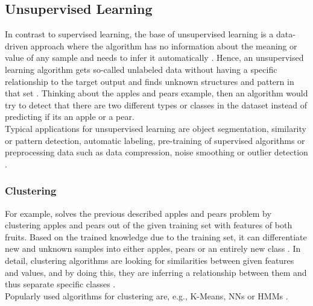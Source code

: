 \documentclass[MGS,Master,english]{twbook}%
\begin{document}
\subsection{Unsupervised Learning}
In contrast to supervised learning, the base of unsupervised learning is a data-driven approach where the algorithm has no information about the meaning or value of any sample and needs to infer it automatically \cite{ml::book::developer}. Hence, an unsupervised learning algorithm gets so-called unlabeled data without having a specific relationship to the target output and finds unknown structures and pattern in that set \cite{ai::book}. Thinking about the apples and pears example, then an algorithm would try to detect that there are two different types or classes in the dataset instead of predicting if its an apple or a pear.\\
Typical applications for unsupervised learning are object segmentation, similarity or pattern detection, automatic labeling, pre-training of supervised algorithms or preprocessing data such as data compression, noise smoothing or outlier detection \cite{ml::book::algorithms} \cite{ai::book}.

\subsubsection{Clustering}
For example, solves the previous described apples and pears problem by clustering apples and pears out of the given training set with features of both fruits. Based on the trained knowledge due to the training set, it can differentiate new and unknown samples into either apples, pears or an entirely new class \cite{ai::book}. In detail, clustering algorithms are looking for similarities between given features and values, and by doing this, they are inferring a relationship between them and thus separate specific classes \cite{ml::book::developer}.\\
Popularly used algorithms for clustering are, e.g., K-Means, \acp{NN} or \acp{HMM}  \cite{ml::book::developer}.
\end{document}

